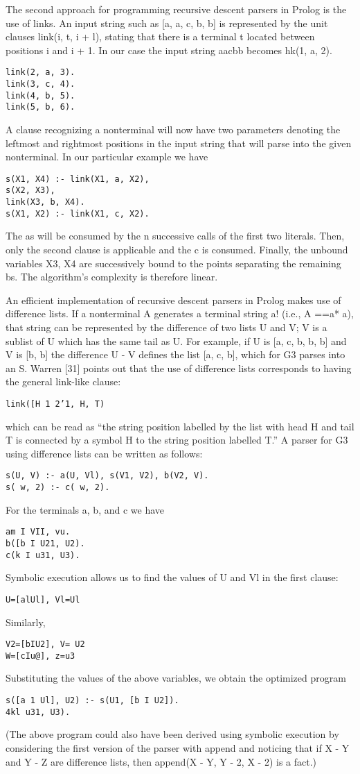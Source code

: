 The second approach for programming recursive descent parsers in Prolog is
the use of links. An input string such as [a, a, c, b, b] is represented by the unit
clauses link(i, t, i + l), stating that there is a terminal t located between positions
i and i + 1. In our case the input string aacbb becomes
hk(1, a, 2).
\begin{verbatim}
link(2, a, 3).
link(3, c, 4).
link(4, b, 5).
link(5, b, 6). 
\end{verbatim}
A clause recognizing a nonterminal will now have two parameters denoting the
leftmost and rightmost positions in the input string that will parse into the given
nonterminal. In our particular example we have
\begin{verbatim}
s(X1, X4) :- link(X1, a, X2),
s(X2, X3),
link(X3, b, X4).
s(X1, X2) :- link(X1, c, X2). 
\end{verbatim}
The as will be consumed by the n successive calls of the first two literals. Then,
only the second clause is applicable and the c is consumed. Finally, the unbound
variables X3, X4 are successively bound to the points separating the remaining
bs. The algorithm’s complexity is therefore linear. 

An efficient implementation of recursive descent parsers in Prolog makes use
of difference lists. If a nonterminal A generates a terminal string a! (i.e., A ==a*
a), that string can be represented by the difference of two lists U and V; V is a
sublist of U which has the same tail as U. For example, if U is [a, c, b, b, b] and
V is [b, b] the difference U - V defines the list [a, c, b], which for G3 parses into
an S. Warren [31] points out that the use of difference lists corresponds to having
the general link-like clause:
\begin{verbatim}
link([H 1 2’1, H, T) 
\end{verbatim}
which can be read as “the string position labelled by the list with head H and
tail T is connected by a symbol H to the string position labelled T.” A parser for
G3 using difference lists can be written as follows:
\begin{verbatim}
s(U, V) :- a(U, Vl), s(V1, V2), b(V2, V).
s( w, 2) :- c( w, 2). 
\end{verbatim}
For the terminals a, b, and c we have
\begin{verbatim}
am I VII, vu.
b([b I U21, U2).
c(k I u31, U3). 
\end{verbatim}
Symbolic execution allows us to find the values of U and Vl in the first clause:
\begin{verbatim}
U=[alUl], Vl=Ul 
\end{verbatim}
Similarly,
\begin{verbatim}
V2=[bIU2], V= U2
W=[cIu@], z=u3 
\end{verbatim}
Substituting the values of the above variables, we obtain the optimized program
\begin{verbatim}
s([a 1 Ul], U2) :- s(U1, [b I U2]).
4kl u31, U3). 
\end{verbatim}
(The above program could also have been derived using symbolic execution
by considering the first version of the parser with append and noticing that
if X - Y and Y - Z are difference lists, then append(X - Y, Y - 2, X - 2) is
a fact.) 


